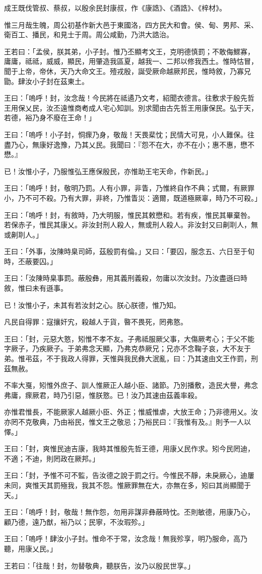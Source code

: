 
\begin{pinyinscope}
成王既伐管叔、蔡叔，以殷余民封康叔，作《康誥》、《酒誥》、《梓材》。

惟三月哉生魄，周公初基作新大邑于東國洛，四方民大和會。侯、甸、男邦、采、衛百工、播民，和見士于周。周公咸勤，乃洪大誥治。

王若曰：「孟侯，朕其弟，小子封。惟乃丕顯考文王，克明德慎罰；不敢侮鰥寡，庸庸，祗祗，威威，顯民，用肇造我區夏，越我一、二邦以修我西土。惟時怙冒，聞于上帝，帝休，天乃大命文王。殪戎殷，誕受厥命越厥邦民，惟時敘，乃寡兄勖。肆汝小子封在茲東土。

王曰：「嗚呼！封，汝念哉！今民將在祗遹乃文考，紹聞衣德言。往敷求于殷先哲王用保乂民，汝丕遠惟商耇成人宅心知訓。別求聞由古先哲王用康保民。弘于天，若德，裕乃身不廢在王命！」

王曰：「嗚呼！小子封，恫瘝乃身，敬哉！天畏棐忱；民情大可見，小人難保。往盡乃心，無康好逸豫，乃其乂民。我聞曰：『怨不在大，亦不在小；惠不惠，懋不懋。』

已！汝惟小子，乃服惟弘王應保殷民，亦惟助王宅天命，作新民。」

王曰：「嗚呼！封，敬明乃罰。人有小罪，非眚，乃惟終自作不典；式爾，有厥罪小，乃不可不殺。乃有大罪，非終，乃惟眚災：適爾，既道極厥辜，時乃不可殺。」

王曰：「嗚呼！封，有敘時，乃大明服，惟民其敕懋和。若有疾，惟民其畢棄咎。若保赤子，惟民其康乂。非汝封刑人殺人，無或刑人殺人。非汝封又曰劓刵人，無或劓刵人。」

王曰：「外事，汝陳時臬司師，茲殷罰有倫。」又曰：「要囚，服念五、六日至于旬時，丕蔽要囚。」

王曰：「汝陳時臬事罰。蔽殷彝，用其義刑義殺，勿庸以次汝封。乃汝盡遜曰時敘，惟曰未有遜事。

已！汝惟小子，未其有若汝封之心。朕心朕德，惟乃知。

凡民自得罪：寇攘奸宄，殺越人于貨，暋不畏死，罔弗憝。

王曰：「封，元惡大憝，矧惟不孝不友。子弗祗服厥父事，大傷厥考心；于父不能字厥子，乃疾厥子。于弟弗念天顯，乃弗克恭厥兄；兄亦不念鞠子哀，大不友于弟。惟弔茲，不于我政人得罪，天惟與我民彝大泯亂，曰：乃其速由文王作罰，刑茲無赦。

不率大戛，矧惟外庶子、訓人惟厥正人越小臣、諸節。乃別播敷，造民大譽，弗念弗庸，瘝厥君，時乃引惡，惟朕憝。已！汝乃其速由茲義率殺。

亦惟君惟長，不能厥家人越厥小臣、外正；惟威惟虐，大放王命；乃非德用乂。汝亦罔不克敬典，乃由裕民，惟文王之敬忌；乃裕民曰：『我惟有及。』則予一人以懌。」

王曰：「封，爽惟民迪吉康，我時其惟殷先哲王德，用康乂民作求。矧今民罔迪，不適；不迪，則罔政在厥邦。」

王曰：「封，予惟不可不監，告汝德之說于罰之行。今惟民不靜，未戾厥心，迪屢未同，爽惟天其罰殛我，我其不怨。惟厥罪無在大，亦無在多，矧曰其尚顯聞于天。」

王曰：「嗚呼！封，敬哉！無作怨，勿用非謀非彝蔽時忱。丕則敏德，用康乃心，顧乃德，遠乃猷，裕乃以；民寧，不汝瑕殄。」

王曰：「嗚呼！肆汝小子封。惟命不于常，汝念哉！無我殄享，明乃服命，高乃聽，用康乂民。」

王若曰：「往哉！封，勿替敬典，聽朕告，汝乃以殷民世享。」


\end{pinyinscope}